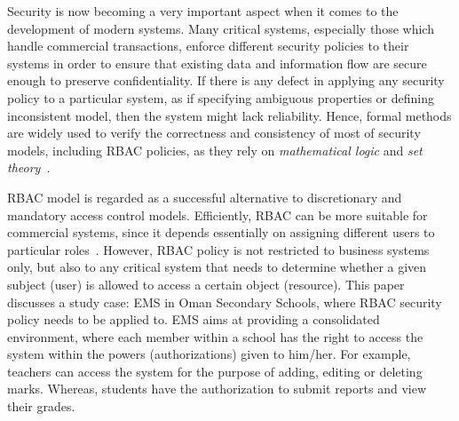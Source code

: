 Security is now becoming a very important aspect when it comes to the development of modern systems. Many critical systems, especially those which handle commercial transactions, enforce different security policies to their systems in order to ensure that existing data and information flow are secure enough to preserve confidentiality. If there is any defect in applying any security policy to a particular system, as if specifying ambiguous properties or defining inconsistent model, then the system might lack reliability. Hence, formal methods are widely used to verify the correctness and consistency of most of security models, including \ac{RBAC} policies, as they rely on \textit{mathematical logic} and \textit{set theory}~\cite{DBS2004}.

RBAC model is regarded as a successful alternative to discretionary and mandatory access control models.  Efficiently, \ac{RBAC} can be more suitable for commercial systems, since it depends essentially on assigning different users to particular roles~\cite{FeKu2009}. However, \ac{RBAC} policy is not restricted to business systems only, but also to any critical system that needs to determine whether a given subject (user) is allowed to access a certain object (resource). 
This paper discusses a study case: \ac{EMS} in Oman Secondary Schools, where \ac{RBAC} security policy needs to be applied to.  EMS aims at providing a consolidated environment, where each member within a school has the right to access the system within the powers (authorizations) given to him/her. For example, teachers can access the system for the purpose of adding, editing or deleting marks.  Whereas, students have the authorization to submit reports and view their grades.


